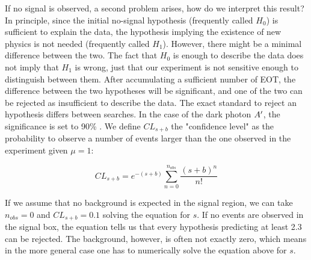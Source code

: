 If no signal is observed, a second problem arises, how do we interpret this result? In principle, since the initial no-signal hypothesis (frequently called $H_0$) is sufficient to explain the data, the hypothesis implying the existence of new physics is not needed (frequently called $H_1$). However, there might be a minimal difference between the two. The fact that $H_0$ is enough to describe the data does not imply that $H_1$ is wrong, just that our experiment is not sensitive enough to distinguish between them. After accumulating a sufficient number of EOT, the difference between the two hypotheses will be significant, and one of the two can be rejected as insufficient to describe the data.
The exact standard to reject an hypothesis differs between searches. In the case of the dark photon $A'$, the significance is set to 90\% \cite{battaglieri2017cosmic}. We define $CL_{s+b}$ the "confidence level" as the probability to observe a number of events larger than the one observed in the experiment given $\mu = 1$:

\begin{equation}
  \label{eq:confidence-level-poisson}
  CL_{s+b} = e^{-(s+b)}\sum^{n_{obs}}_{n=0} \frac{(s+b)^n}{n!}
\end{equation}

If we assume that no background is expected in the signal region, we can take $n_{obs} = 0$ and $CL_{s+b} = 0.1$ solving the equation for $s$. If no events are observed in the signal box, the equation tells us that every hypothesis predicting at least 2.3 can be rejected. The background, however, is often not exactly zero, which means in the more general case one has to numerically solve the equation above for $s$.

